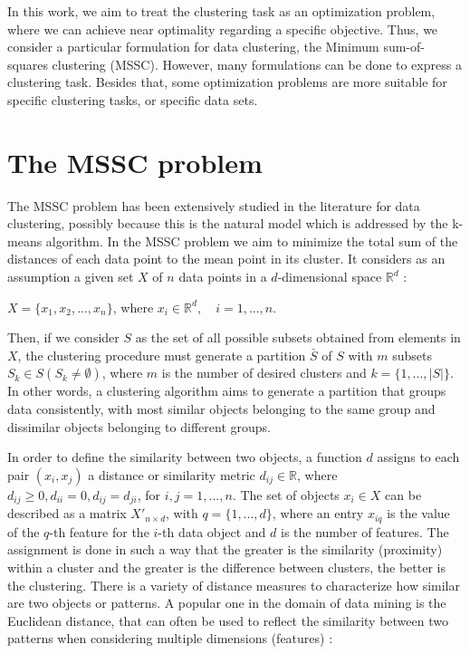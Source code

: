 In this work, we aim to treat the clustering task as an optimization problem, where we can achieve near optimality regarding a specific objective. Thus, we consider a particular formulation for data clustering, the Minimum sum-of-squares clustering (MSSC). However, many formulations can be done to express a clustering task. Besides that, some optimization problems are more suitable for specific clustering tasks, or specific data sets.

\section{The MSSC problem}
The MSSC problem has been extensively studied in the literature for data clustering, possibly because this is the natural model which is addressed by the k-means algorithm. In the MSSC problem we aim to minimize the total sum of the distances of each data point to the mean point in its cluster. It considers as an assumption a given set $X$ of $n$ data points in a $d$-dimensional space $\mathbb{R}^d$ \cite{Bagirov2006}:

\begin{center}%
$X = \{x_1, x_2, ..., x_n\}$, where $x_i \in \mathbb{R}^d, \quad i = 1, ..., n.$
\end{center}

Then, if we consider $S$ as the set of all possible subsets obtained from elements in $X$, the clustering procedure must generate a partition $\bar{S}$ of $S$ with $m$ subsets $S_k \in S (S_k \neq \emptyset)$, where $m$ is the number of desired clusters and $k = \{1,...,\left | S \right |\}$. In other words, a clustering algorithm aims to generate a partition that groups data consistently, with most similar objects belonging to the same group and dissimilar objects belonging to different groups.

In order to define the similarity between two objects, a function $d$ assigns to each pair $(x_i, x_j)$ a distance or similarity metric $d_{ij} \in \mathbb{R}$, where $d_{ij} \geq 0, d_{ii} = 0, d_{ij} = d_{ji}$, for $i, j = 1, ... ,n$. The set of objects $x_i \in X$ can be described as a matrix $X'_{n \times d}$, with $q = \{1,...,d\}$, where an entry $x_{iq}$ is the value of the $q$-th feature for the $i$-th data object and $d$ is the number of features. The assignment is done in such a way that the greater is the similarity (proximity) within a cluster and the greater is the difference between clusters, the better is the clustering. There is a variety of distance measures to characterize how similar are two objects or patterns. A popular one in the domain of data mining is the Euclidean distance, that can often be used to reflect the similarity between two patterns when considering multiple dimensions (features) \cite{Jain1999}:

